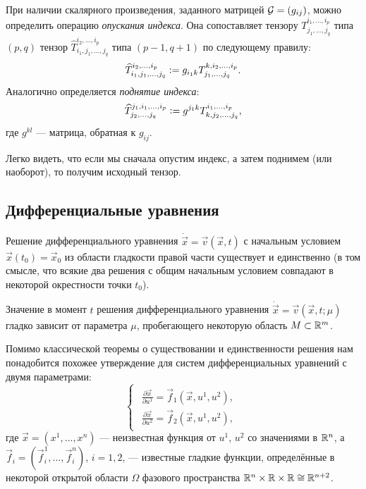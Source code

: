 \begin{definition}
	При наличии скалярного произведения, заданного матрицей $\mathcal{G} = (g_{ij})$, можно определить операцию \textit{опускания индекса}. Она сопоставляет тензору $T^{i_1, \ldots, i_p}_{j_1, \ldots, j_q}$ типа $(p, q)$ тензор $\widehat{T}^{i_2, \ldots, i_p}_{i_1, j_1, \ldots, j_q}$ типа $(p - 1, q + 1)$ по следующему правилу:
	\[
		\widehat{T}^{i_2, \ldots, i_p}_{i_1, j_1, \ldots, j_q} \vcentcolon = g_{i_1k}T^{k, i_2, \ldots, i_p}_{j_1, \ldots, j_q}.
	\]
	Аналогично определяется \textit{поднятие индекса}:
	\[
		\widehat{T}^{j_1, i_1,\ldots, i_p}_{j_2, \ldots, j_q} \vcentcolon = g^{j_1k}T^{i_1, \ldots, i_p}_{k, j_2, \ldots, j_q},
	\]
	где $g^{kl}$ --- матрица, обратная к $g_{ij}$.
\end{definition}

Легко видеть, что если мы сначала опустим индекс, а затем поднимем (или наоборот), то получим исходный тензор.

\subsection{Дифференциальные уравнения}

\begin{theorem}
	Решение дифференциального уравнения $\dot{\vec{x}} = \vec{v}(\vec{x}, t)$ с начальным условием $\vec{x}(t_0) = \vec{x}_0$ из области гладкости правой части существует и единственно (в том смысле, что всякие два решения с общим начальным условием совпадают в некоторой окрестности точки $t_0$).
\end{theorem}

\begin{theorem}
	Значение в момент $t$ решения дифференциального уравнения $\dot{\vec{x}} = \vec{v}(\vec{x}, t; \mu)$ гладко зависит от параметра $\mu$, пробегающего некоторую область $M \subset \mathbb{R}^m$.
\end{theorem}

Помимо классической теоремы о существовании и единственности решения нам понадобится похожее утверждение для систем дифференциальных уравнений с двумя параметрами:
\begin{equation} \label{eq:DiffSystem}
	\begin{cases}
		\begin{aligned}
			\frac{\partial\vec{x}}{\partial u^1} = \vec{f}_1(\vec{x}, u^1, u^2),\\
			\frac{\partial\vec{x}}{\partial u^2} = \vec{f}_2(\vec{x}, u^1, u^2),
		\end{aligned}
	\end{cases}
\end{equation}
где $\vec{x} = (x^1, \ldots, x^n)$ --- неизвестная функция от $u^1$, $u^2$ со значениями в $\mathbb{R}^n$, а $\vec{f}_i = (\vec{f}_i^1, \ldots, \vec{f}_i^n)$, $i = 1, 2$, --- известные гладкие функции, определённые в некоторой открытой области $\Omega$ фазового пространства $\mathbb{R}^n \times \mathbb{R} \times \mathbb{R} \cong \mathbb{R}^{n + 2}$.

